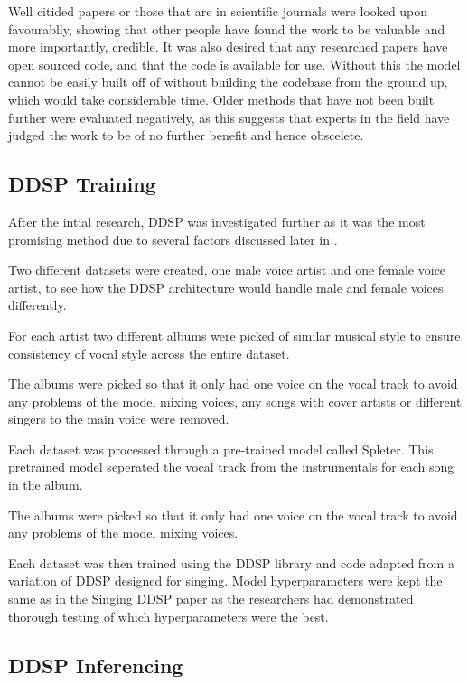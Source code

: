 Well citided papers or those that are in scientific journals were looked upon favourablly, showing that other people have found the work to be valuable and more importantly, credible. It was also desired that any researched papers have open sourced code, and that the code is available for use. Without this the model cannot be easily built off of without building the codebase from the ground up, which would take considerable time. Older methods that have not been built further were evaluated negatively, as this suggests that experts in the field have judged the work to be of no further benefit and hence obscelete.

\subsection{DDSP Training}

After the intial research, DDSP was investigated further as it was the most promising method due to several factors discussed later in .

Two different datasets were created, one male voice artist and one female voice artist, to see how the DDSP architecture would handle male and female voices differently.

For each artist two different albums were picked of similar musical style to ensure consistency of vocal style across the entire dataset.

The albums were picked so that it only had one voice on the vocal track to avoid any problems of the model mixing voices, any songs with cover artists or different singers to the main voice were removed.

Each dataset was processed through a pre-trained model called Spleter\cite{Spleeter}. This pretrained model seperated the vocal track from the instrumentals for each song in the album.

The albums were picked so that it only had one voice on the vocal track to avoid any problems of the model mixing voices.

Each dataset was then trained using the DDSP library\cite{DDSPPip} and code adapted from a variation of DDSP designed for singing\cite{SingingDDSP}. Model hyperparameters were kept the same as in the Singing DDSP paper\cite{SingingDDSP} as the researchers had demonstrated thorough testing of which hyperparameters were the best.

\subsection{DDSP Inferencing}

